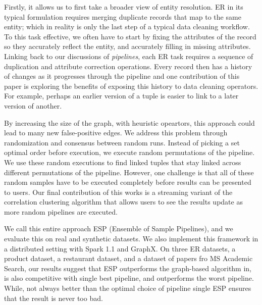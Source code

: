 Firstly, it allows us to first take a broader view of entity resolution.
ER in its typical formulation requires merging duplicate records that map to the same entity; which in reality is only the last step of a typical data cleaning workflow.
To this task effective, we often have to start by fixing the attributes of the record so they accurately reflect the entity, and accurately filling in missing attributes.
Linking back to our discussions of \emph{pipelines}, each ER task requires a sequence of duplication and attribute correction operations.
Every record then has a history of changes as it progresses through the pipeline and one contribution of this paper is exploring the benefits of exposing this history to data cleaning operators.
For example, perhaps an earlier version of a tuple is easier to link to a later version of another.

By increasing the size of the graph, with heuristic opeartors, this approach could lead to many new false-positive edges. 
We address this problem through randomization and consensus between random runs.
Instead of picking a set optimal order before execution, we execute random permutations of the pipeline.
We use these random executions to find linked tuples that stay linked across different permutations of the pipeline.
However, one challenge is that all of these random samples have to be executed completely before results can be presented to users.
Our final contribution of this works is a streaming variant of the correlation clustering algorithm that allows users to see the results update as more random pipelines are executed.

We call this entire approach ESP (Ensemble of Sample Pipelines), and we evaluate this on real and synthetic datasets.
We also implement this framework in a distributed setting with Spark 1.1 and GraphX.
On three ER datasets, a product dataset, a restaurant dataset, and a dataset of papers fro MS Academic Search, 
our results suggest that ESP outperforms the graph-based algorithm in\cite{wang2012crowder}, is also competitive with single best pipeline, and outperforms the worst pipeline.
While, not always better than the optimal choice of pipeline single ESP ensures that the result is never too bad.









